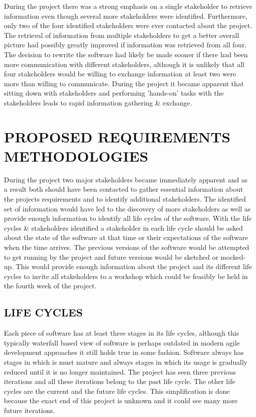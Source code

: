 \documentclass[conference]{IEEEtran}
\begin{document}
During the project there was a strong emphasis on a single stakeholder to retrieve information even though several more stakeholders were identified. Furthermore, only two of the four identified stakeholders were ever contacted about the project. The retrieval of information from multiple stakeholders to get a better overall picture had possibly greatly improved if information was retrieved from all four. The decision to rewrite the software had likely be made sooner if there had been more communication with different stakeholders, although it is unlikely that all four stakeholders would be willing to exchange information at least two were more than willing to communicate. During the project it became apparent that sitting down with stakeholders and performing 'hands-on' tasks with the stakeholders leads to rapid information gathering \& exchange.

\section{PROPOSED REQUIREMENTS METHODOLOGIES}

During the project two major stakeholders became immediately apparent and as a result both should have been contacted to gather essential information about the projects requirements and to identify additional stakeholders. The identified set of information would have led to the discovery of more stakeholders as well as provide enough information to identify all life cycles of the software. With the life cycles \& stakeholders identified a stakeholder in each life cycle should be asked about the state of the software at that time or their expectations of the software when the time arrives. The previous versions of the software would be attempted to get running by the project and future versions would be sketched or mocked-up. This would provide enough information about the project and its different life cycles to invite all stakeholders to a workshop which could be feasibly be held in the fourth week of the project.

\subsection{LIFE CYCLES}

Each piece of software has at least three stages in its life cycles, although this typically waterfall based view of software is perhaps outdated in modern agile development approaches it still holds true in some fashion. Software always has stages in which is must mature and always stages in which its usage is gradually reduced until it is no longer maintained. The project has seen three previous iterations and all these iterations belong to the past life cycle. The other life cycles are the current and the future life cycles. This simplification is done because the exact end of this project is unknown and it could see many more future iterations. 
\end{document}
